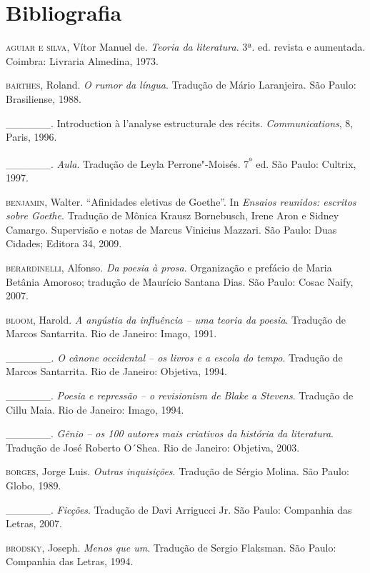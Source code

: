 \chapter{Bibliografia}

\begin{Parskip}

\textsc{aguiar e silva}, Vítor Manuel de. \emph{Teoria da literatura}.
3ª. ed. revista e aumentada. Coimbra: Livraria Almedina, 1973.

\textsc{barthes}, Roland. \emph{O rumor da língua}. Tradução de Mário
Laranjeira. São Paulo: Brasiliense, 1988.

\_\_\_\_\_\_. Introduction à l'analyse estructurale des récits.
\emph{Communications}, 8, Paris, 1996.

\textsc{\_\_\_\_\_\_}. \emph{Aula}. Tradução de Leyla Perrone"-Moisés.
7\textsuperscript{ª} ed. São Paulo: Cultrix, 1997.

\textsc{benjamin,} Walter. ``Afinidades eletivas de Goethe''. In
\emph{Ensaios reunidos: escritos sobre Goethe}. Tradução de Mônica
Krausz Bornebusch, Irene Aron e Sidney Camargo. Supervisão e notas de
Marcus Vinicius Mazzari. São Paulo: Duas Cidades; Editora 34, 2009.

\textsc{berardinelli}, Alfonso. \emph{Da poesia à prosa}. Organização e
prefácio de Maria Betânia Amoroso; tradução de Maurício Santana Dias.
São Paulo: Cosac Naify, 2007.

\textsc{bloom}, Harold. \emph{A angústia da influência -- uma teoria da
poesia}. Tradução de Marcos Santarrita. Rio de Janeiro: Imago, 1991.

\textsc{\_\_\_\_\_\_}\emph{. O cânone occidental -- os livros e a
escola do tempo}. Tradução de Marcos Santarrita. Rio de Janeiro:
Objetiva, 1994.

\_\_\_\_\_\_. \emph{Poesia e repressão -- o revisionism de Blake a
Stevens}. Tradução de Cillu Maia. Rio de Janeiro: Imago, 1994.

\_\_\_\_\_\_. \emph{Gênio -- os 100 autores mais criativos da história
da literatura}. Tradução de José Roberto O´Shea. Rio de Janeiro:
Objetiva, 2003.

\textsc{borges}, Jorge Luis. \emph{Outras inquisições}. Tradução de
Sérgio Molina. São Paulo: Globo, 1989.

\textsc{\_\_\_\_\_\_}. \emph{Ficções}. Tradução de Davi Arrigucci Jr.
São Paulo: Companhia das Letras, 2007.

\textsc{brodsky}, Joseph. \emph{Menos que um}. Tradução de Sergio
Flaksman. São Paulo: Companhia das Letras, 1994.


\end{Parskip}
